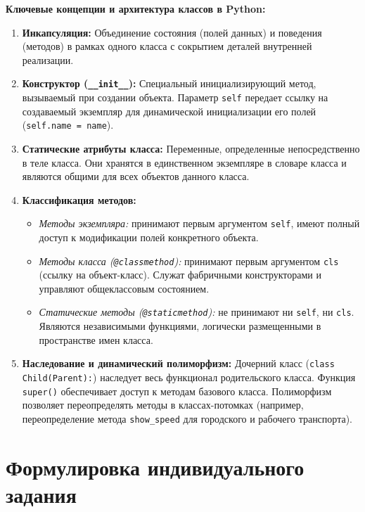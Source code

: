 \documentclass[14pt,a4paper]{extarticle}
\begin{document}
\textbf{Ключевые концепции и архитектура классов в Python:}
\begin{enumerate}
    \item \textbf{Инкапсуляция:} Объединение состояния (полей данных) и поведения (методов) в рамках одного класса с сокрытием деталей внутренней реализации.
    \item \textbf{Конструктор (\texttt{\_\_init\_\_}):} Специальный инициализирующий метод, вызываемый при создании объекта. Параметр \texttt{self} передает ссылку на создаваемый экземпляр для динамической инициализации его полей (\texttt{self.name = name}).
    \item \textbf{Статические атрибуты класса:} Переменные, определенные непосредственно в теле класса. Они хранятся в единственном экземпляре в словаре класса и являются общими для всех объектов данного класса.
    \item \textbf{Классификация методов:}
    \begin{itemize}
        \item \textit{Методы экземпляра:} принимают первым аргументом \texttt{self}, имеют полный доступ к модификации полей конкретного объекта.
        \item \textit{Методы класса (\texttt{@classmethod}):} принимают первым аргументом \texttt{cls} (ссылку на объект-класс). Служат фабричными конструкторами и управляют общеклассовым состоянием.
        \item \textit{Статические методы (\texttt{@staticmethod}):} не принимают ни \texttt{self}, ни \texttt{cls}. Являются независимыми функциями, логически размещенными в пространстве имен класса.
    \end{itemize}
    \item \textbf{Наследование и динамический полиморфизм:} Дочерний класс (\texttt{class Child(Parent):}) наследует весь функционал родительского класса. Функция \texttt{super()} обеспечивает доступ к методам базового класса. Полиморфизм позволяет переопределять методы в классах-потомках (например, переопределение метода \texttt{show\_speed} для городского и рабочего транспорта).
\end{enumerate}

\clearpage
\section{Формулировка индивидуального задания}
\end{document}
